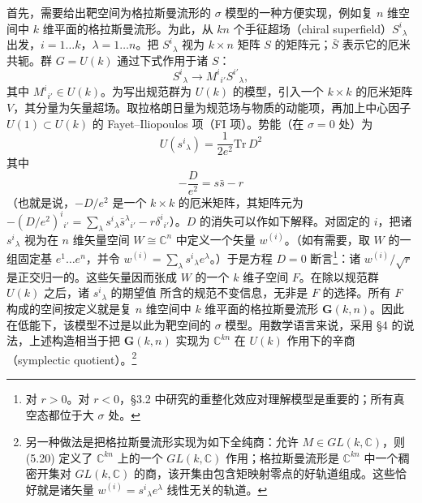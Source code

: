 首先，需要给出靶空间为格拉斯曼流形的 $\sigma$ 模型的一种方便实现，例如复 $n$ 维空间中 $k$ 维平面的格拉斯曼流形。为此，从 $kn$ 个手征超场（chiral superfield）$S^{i}{}_{\lambda}$ 出发，$i=1\ldots k$，$\lambda=1\ldots n$。把 $S^{i}{}_{\lambda}$ 视为 $k\times n$ 矩阵 $S$ 的矩阵元；$\bar S$ 表示它的厄米共轭。群 $G=U(k)$ 通过下式作用于诸 $S$：
\begin{equation}\tag{5.20}
S^{i}{}_{\lambda}\to M^{i}{}_{i'}S^{i'}{}_{\lambda},
\end{equation}
其中 $M^{i}{}_{i'}\in U(k)$。为写出规范群为 $U(k)$ 的模型，引入一个 $k\times k$ 的厄米矩阵 $V$，其分量为矢量超场。取拉格朗日量为规范场与物质的动能项，再加上中心因子 $U(1)\subset U(k)$ 的 Fayet--Iliopoulos 项（FI 项）。势能（在 $\sigma=0$ 处）为
\begin{equation}\tag{5.21}
U(s^{i}{}_{\lambda})=\frac{1}{2e^2}\mathrm{Tr}\,D^2
\end{equation}
其中
\begin{equation}\tag{5.22}
-\frac{D}{e^2}=s\bar{s}-r
\end{equation}
（也就是说，$-D/e^2$ 是一个 $k\times k$ 的厄米矩阵，其矩阵元为 $-(D/e^2)^{i}{}_{i'}=\sum_{\lambda}s^{i}{}_{\lambda}\bar s^{\lambda}{}_{i'}-r\delta^{i}{}_{i'}$）。$D$ 的消失可以作如下解释。对固定的 $i$，把诸 $s^{i}{}_{\lambda}$ 视为在 $n$ 维矢量空间 $W\cong\mathbb{C}^n$ 中定义一个矢量 $w^{(i)}$。（如有需要，取 $W$ 的一组固定基 $e^{1}\ldots e^{n}$，并令 $w^{(i)}=\sum_{\lambda}s^{i}{}_{\lambda}e^{\lambda}$。）于是方程 $D=0$ 断言\footnote{对 $r>0$。对 $r<0$，§3.2 中研究的重整化效应对理解模型是重要的；所有真空态都位于大 $\sigma$ 处。}：诸 $w^{(i)}/\sqrt{r}$ 是正交归一的。这些矢量因而张成 $W$ 的一个 $k$ 维子空间 $F$。在除以规范群 $U(k)$ 之后，诸 $s^{i}{}_{\lambda}$ 的期望值%
\label{op:60}
所含的规范不变信息，无非是 $F$ 的选择。所有 $F$ 构成的空间按定义就是复 $n$ 维空间中 $k$ 维平面的格拉斯曼流形 $\mathbf{G}(k,n)$。因此在低能下，该模型不过是以此为靶空间的 $\sigma$ 模型。用数学语言来说，采用 §4 的说法，上述构造相当于把 $\mathbf{G}(k,n)$ 实现为 $\mathbb{C}^{kn}$ 在 $U(k)$ 作用下的辛商（symplectic quotient）。\footnote{另一种做法是把格拉斯曼流形实现为如下全纯商：允许 $M\in GL(k,\mathbb{C})$，则 (5.20) 定义了 $\mathbb{C}^{kn}$ 上的一个 $GL(k,\mathbb{C})$ 作用；格拉斯曼流形是 $\mathbb{C}^{kn}$ 中一个稠密开集对 $GL(k,\mathbb{C})$ 的商，该开集由包含矩映射零点的好轨道组成。这些恰好就是诸矢量 $w^{(i)}=s^{i}{}_{\lambda}e^{\lambda}$ 线性无关的轨道。}

